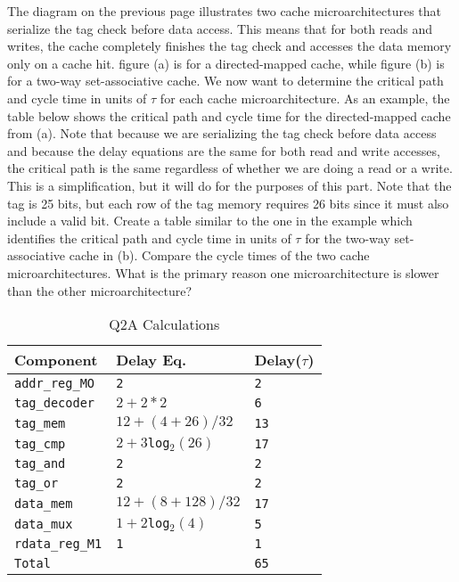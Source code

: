 \documentclass[a4paper,11pt]{article}
\newcommand{\T}{\texttt}
\newcommand{\V}{\verb}
\begin{document}
The diagram on the previous page illustrates two cache microarchitectures that serialize the tag check before data access. This means that for both reads and writes, the cache completely finishes the tag check and accesses the data memory only on a cache hit. figure (a) is for a directed-mapped cache, while figure (b) is for a two-way set-associative cache. We now want to determine the critical path and cycle time in units of $\tau$ for each cache microarchitecture. As an example, the table below shows the critical path and cycle time for the directed-mapped cache from (a). Note that because we are serializing the tag check before data access and because the delay equations are the same for both read and write accesses, the critical path is the same regardless of whether we are doing a read or a write. This is a simplification, but it will do for the purposes of this part. Note that the tag is 25 bits, but each row of the tag memory requires 26 bits since it must also include a valid bit. Create a table similar to the one in the example which identifies the critical path and cycle time in units of $\tau$ for the two-way set-associative cache in (b). Compare the cycle times of the two cache microarchitectures. What is the primary reason one microarchitecture is slower than the other microarchitecture?

\begin{table}[H]
\caption{Q2A Calculations} \label{tab:q2Atable} 
\begin{center}
\begin{tabular}{| l | l | l |}
\hline
  Component         &  Delay Eq.              & Delay($\tau$)          \\ \hline
  \V.addr_reg_MO.   &   \T{2}                 & \T{2}                  \\ \hline
  \V.tag_decoder.   &   \T{$2+2*2$}           & \T{6}                  \\ \hline
  \V.tag_mem.       &   \T{$12+(4+26)/32$}    & \T{13}                 \\ \hline
  \V.tag_cmp.       &   \T{$2+3$log$_2(26)$}  & \T{17}                 \\ \hline
  \V.tag_and.       &   \T{2}                 & \T{2}                  \\ \hline
  \V.tag_or.        &   \T{2}                 & \T{2}                  \\ \hline
  \V.data_mem.      &   \T{$12+(8+128)/32$}   & \T{17}                 \\ \hline
  \V.data_mux.      &   \T{$1+2$log$_2(4)$}   & \T{5}                  \\ \hline
  \V.rdata_reg_M1.  &   \T{1}                 & \T{1}                  \\ \hline \hline
  \V.Total.         &   \T{}                  & \T{65}                 \\ \hline
\end{tabular}
\end{center}
\end{table}
\end{document}
